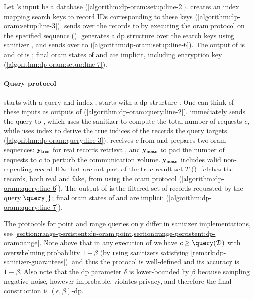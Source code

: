 			Let \user{}'s input be a database \databaseDef{} (\cref{algorithm:dp-oram:setup:line-2}).
			\user{} creates an index \indexI{} mapping search keys to record IDs corresponding to these keys (\cref{algorithm:dp-oram:setup:line-3}).
			\user{} sends over the records to \server{} by executing the \acrshort{oram} protocol on the specified sequence ().
			\user{} generates a \acrshort{dp} structure \serverDS{} over the search keys using sanitizer , and sends \serverDS{} over to \server{} (\cref{algorithm:dp-oram:setup:line-6}).
			The output of \user{} is \indexI{} and of \server{} is \serverDS{}; final \acrshort{oram} states of \server{} and \user{} are implicit, including encryption key \queryKey{} (\cref{algorithm:dp-oram:setup:line-7}).

		\paragraph*{Query protocol \; \texorpdfstring{\protocolQuery{}}{}}

			\user{} starts with a query \query{} and index \indexI{}, \server{} starts with a \acrshort{dp} structure \serverDS{}.
			One can think of these inputs as outputs of \protocolSetup{} (\cref{algorithm:dp-oram:query:line-2}).
			\user{} immediately sends the query to \server{}, which uses the sanitizer  to compute the total number of requests $c$, while \user{} uses index \indexI{} to derive the true indices of the records the query \query{} targets (\cref{algorithm:dp-oram:query:line-3}).
			\user{} receives $c$ from \server{} and prepares two \acrshort{oram} sequences: $\mathbf{y}_\mathsf{true}$ for real records retrieval, and $\mathbf{y}_\mathsf{noise}$ to pad the number of requests to $c$ to perturb the communication volume.
			$\mathbf{y}_\mathsf{noise}$ includes valid non-repeating record IDs that are not part of the true result set $T$ ().
			\user{} fetches the records, both real and fake, from \server{} using the \acrshort{oram} protocol (\cref{algorithm:dp-oram:query:line-6}).
			The output of \user{} is the filtered set of records requested by the query $\query{}$; final \acrshort{oram} states of \server{} and \user{} are implicit (\cref{algorithm:dp-oram:query:line-7}).

		The protocols for point and range queries only differ in sanitizer implementations, see \cref{section:range-persistent:dp-oram:point,section:range-persistent:dp-oram:range}.
		Note above that in any execution of \protocolQuery{} we have $c \geq \query(\database)$ with overwhelming probability $1 - \beta$ (by using sanitizers satisfying \cref{remark:dp-sanitizer-guarantees}), and thus the protocol is well-defined and its accuracy is $1 - \beta$.
		Also note that the \acrshort{dp} parameter $\delta$ is lower-bounded by $\beta$ because sampling negative noise, however improbable, violates privacy, and therefore the final construction is $(\epsilon, \beta)$-\acrshort{dp}.

